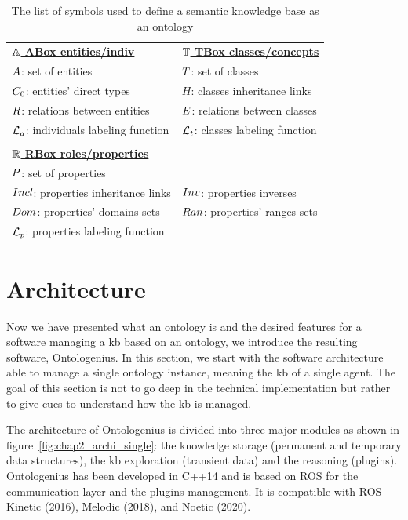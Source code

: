 \begin{table}[ht!]
\caption{The list of symbols used to define a semantic knowledge base as an ontology }
\label{tab:onto_symboles}
\begin{tabular}{ll}
{\ul \textbf{$\mathbb{A}$ ABox entities/indiv}} & {\ul \textbf{$\mathbb{T}$ TBox classes/concepts}}  \\
$A$: set of entities               & $T$: set of classes  \\
$C_0$: entities' direct types        & $H$: classes inheritance links \\
$R$: relations between entities    & $E$: relations between classes  \\
$\mathcal{L}_a$: individuals labeling function & $\mathcal{L}_t$: classes labeling function \\
 & \\
\multicolumn{2}{l}{{\ul \textbf{$\mathbb{R}$ RBox roles/properties}}}                          \\
$P$: set of properties              &                                              \\
$Incl$: properties inheritance links       & $Inv$: properties inverses                   \\
$Dom$: properties' domains sets     & $Ran$: properties' ranges sets   \\
$\mathcal{L}_p$: properties labeling function & \\
\end{tabular}
\end{table}

\section{Architecture}

Now we have presented what an ontology is and the desired features for a software managing a \acrfull{kb} based on an ontology, we introduce the resulting software, Ontologenius. In this section, we start with the software architecture able to manage a single ontology instance, meaning the \acrshort{kb} of a single agent. The goal of this section is not to go deep in the technical implementation but rather to give cues to understand how the \acrshort{kb} is managed.

The architecture of Ontologenius is divided into three major modules as shown in figure~\ref{fig:chap2_archi_single}: the knowledge storage (permanent and temporary data structures), the \acrshort{kb} exploration (transient data) and the reasoning (plugins). Ontologenius has been developed in C++14 and is based on ROS for the communication layer and the plugins management. It is compatible with ROS Kinetic (2016), Melodic (2018), and Noetic (2020). 

